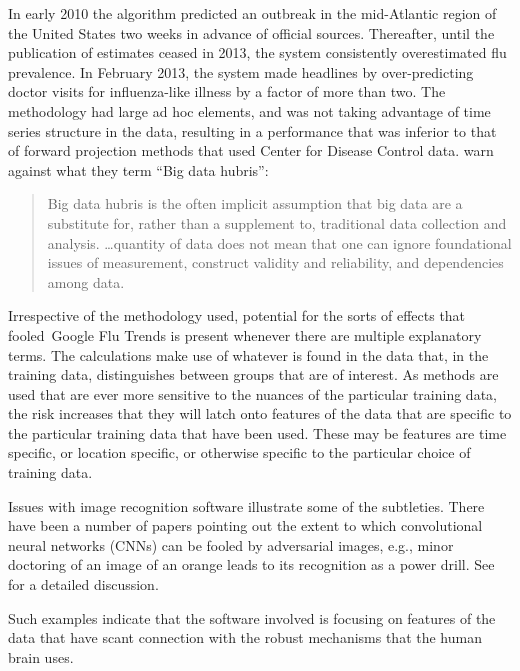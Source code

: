 In early 2010 the algorithm predicted an outbreak
in the mid-Atlantic region of the United States two weeks in
advance of official sources.  Thereafter, until the publication
of estimates ceased in 2013, the system consistently
overestimated flu prevalence.  In February 2013, the system
made headlines by over-predicting doctor visits for
influenza-like illness by a factor of more than two.
The methodology had large ad hoc elements, and was not
taking advantage of time series structure in the data,
resulting in a performance that was inferior to that of
forward projection methods that used Center for Disease
Control data.   warn against what
they term ``Big data hubris'':
\vspace*{-9pt}

\begin{quote}
Big data hubris is the often implicit assumption that big data are
a substitute for, rather than a supplement to, traditional data
collection and analysis. \ldots quantity of data does not mean
that one can ignore foundational issues of measurement, construct
validity and reliability, and dependencies among data.
\end{quote}

Irrespective of the methodology used, potential for the sorts of
effects that fooled Google Flu Trends is present whenever there
are multiple explanatory terms.  The calculations make use of
whatever is found in the data that, in the training data,
distinguishes between groups that are of interest.  As methods
are used that are ever more sensitive to the nuances of the
particular training data, the risk increases that they will
latch onto features of the data that are specific to the
particular training data that have been used.  These may be
features are time specific, or location specific, or otherwise
specific to the particular choice of training data.  

Issues with image recognition software illustrate some of the
subtleties.  There have been a number of papers pointing out the extent to which
convolutional neural networks (CNNs) can be fooled by adversarial
images, e.g., minor doctoring of an image of an orange leads to its
recognition as a power drill.  See \citet{Zhou2019} for a detailed
discussion.

Such examples indicate that the software involved is focusing on
features of the data that have scant connection with the robust
mechanisms that the human brain uses.

